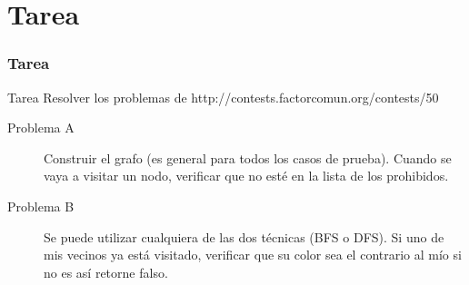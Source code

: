 \documentclass{beamer}
\begin{document}
\section{Tarea}
	\begin{frame}
		\frametitle{Tarea}
		\begin{alertblock}{Tarea}
			Resolver los problemas de http://contests.factorcomun.org/contests/50
			\begin{description}
				\item[Problema A] Construir el grafo (es general para todos los casos de prueba). Cuando se vaya a visitar un nodo, verificar que no esté en la lista de los prohibidos.
				\item[Problema B] Se puede utilizar cualquiera de las dos técnicas (BFS o DFS). Si uno de mis vecinos ya está visitado, verificar que su color sea el contrario al mío si no es así retorne falso.
			\end{description}
		\end{alertblock}
	\end{frame}
	
\end{document}
